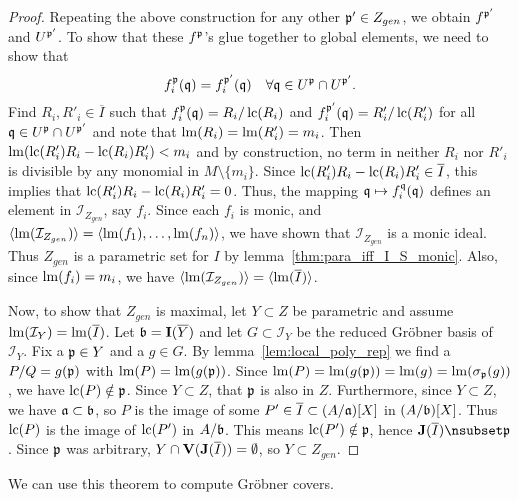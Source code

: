 \begin{proof}
  Repeating the above construction for any other $\mathfrak p' \in Z_{gen}$, we obtain $f^{\mathfrak p'}$ and $U^{\mathfrak p'}$. To show that these $f^{\mathfrak p}$'s glue together to global elements, we need to show that
  \[f^{\mathfrak p}_{i}(\mathfrak{q}) = f^{\mathfrak p'}_{i}(\mathfrak{q}) \quad \forall \mathfrak{q} \in U^{\mathfrak p} \cap U^{\mathfrak p'}.\]
  Find $R_{i}, R'_{i} \in \overline I$ such that $f^{\mathfrak p}_{i}(\mathfrak{q}) = R_{i}/\operatorname{lc}(R_{i})$ and $f^{\mathfrak p'}_{i}(\mathfrak{q}) = R'_{i}/\operatorname{lc}(R'_{i})$ for all $\mathfrak{q} \in U^{\mathfrak p} \cap U^{\mathfrak p'}$ and note that $\operatorname{lm}(R_{i}) = \operatorname{lm}(R'_{i}) = m_{i}$. Then $\operatorname{lm}(\operatorname{lc}(R'_{i}) R_{i} - \operatorname{lc}(R_{i}) R'_{i}) < m_{i}$ and by construction, no term in neither $R_{i}$ nor $R'_{i}$ is divisible by any monomial in $M \setminus \{m_{i}\}$. Since $\operatorname{lc}(R'_{i}) R_{i} - \operatorname{lc}(R_{i}) R'_{i} \in \overline I$, this implies that $\operatorname{lc}(R'_{i}) R_{i} - \operatorname{lc}(R_{i}) R'_{i} = 0$. Thus, the mapping $\mathfrak{q} \mapsto f^{\mathfrak{q}}_{i}(\mathfrak{q})$ defines an element in $\mathcal I_{Z_{gen}}$, say $f_{i}$. Since each $f_{i}$ is monic, and $\langle \operatorname{lm}(\mathcal I_{Z_{gen}}) \rangle = \langle \operatorname{lm}(f_{1}), \dots, \operatorname{lm}(f_{n}) \rangle$, we have shown that $\mathcal I_{Z_{gen}}$ is a monic ideal. Thus $Z_{gen}$ is a parametric set for $I$ by lemma~\ref{thm:para_iff_I_S_monic}. Also, since $\operatorname{lm}(f_{i}) = m_{i}$, we have $\langle \operatorname{lm}(\mathcal I_{Z_{gen}}) \rangle = \langle \operatorname{lm}(\overline I) \rangle$.

  Now, to show that $Z_{gen}$ is maximal, let $Y \subset Z$ be parametric and assume $\operatorname{lm}(\mathcal I_{Y}) = \operatorname{lm}(\overline I)$. Let $\mathfrak{b} = \operatorname{\mathbf I}(\overline Y)$ and let $G \subset \mathcal I_{Y}$ be the reduced Gröbner basis of $\mathcal I_{Y}$. Fix a $\mathfrak p \in Y$ and a $g \in G$. By lemma~\ref{lem:local_poly_rep} we find a $P/Q = g(\mathfrak p)$ with $\operatorname{lm}(P) = \operatorname{lm}(g(\mathfrak p))$. Since $\operatorname{lm}(P) = \operatorname{lm}(g(\mathfrak p)) = \operatorname{lm}(g) = \operatorname{lm}(\sigma_{\mathfrak p}(g))$, we have $\operatorname{lc}(P) \notin \mathfrak p$. Since $Y \subset Z$, that $\mathfrak p$ is also in $Z$. Furthermore, since $Y \subset Z$, we have $\mathfrak{a} \subset \mathfrak{b}$, so $P$ is the image of some $P' \in \overline I \subset (A/\mathfrak{a})[X]$ in $(A/\mathfrak{b})[X]$. Thus $\operatorname{lc}(P)$ is the image of $\operatorname{lc}(P')$ in $A/\mathfrak{b}$. This means $\operatorname{lc}(P') \notin \mathfrak p$, hence $\J(\overline I) \nsubset \p$. Since $\mathfrak p$ was arbitrary, $Y \cap \operatorname{\mathbf V}(\operatorname{\mathbf J}(\overline I)) = \emptyset$, so $Y \subset Z_{gen}$.
\end{proof}

We can use this theorem to compute Gröbner covers.


